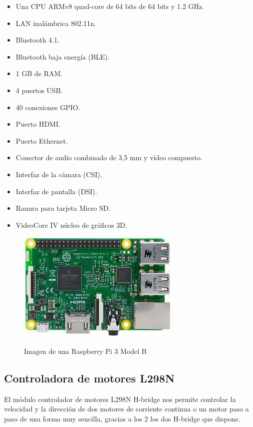\begin{itemize}
 \item Una CPU ARMv8 quad-core de 64 bits de 64 bits y 1.2 GHz.
 \item LAN inalámbrica 802.11n.
 \item Bluetooth 4.1.
 \item Bluetooth baja energía (BLE).
 \item 1 GB de RAM.
 \item 4 puertos USB.
 \item 40 conexiones GPIO.
 \item Puerto HDMI.
 \item Puerto Ethernet.
 \item Conector de audio combinado de 3,5 mm y vídeo compuesto.
 \item Interfaz de la cámara (CSI).
 \item Interfaz de pantalla (DSI).
 \item Ranura para tarjeta Micro SD.
 \item VideoCore IV núcleo de gráficos 3D. 
\end{itemize}


\begin{figure}[H]
  \begin{center}
    \includegraphics[scale=0.5]{imagenes/raspberry-pi.jpg}\\
    \caption{Imagen de una Raspberry Pi 3 Model B}
  \end{center}
\end{figure}


\subsection{Controladora de motores L298N}


El módulo controlador de motores L298N H-bridge nos permite controlar la velocidad y la dirección de dos motores de corriente continua o un motor paso a paso de una forma muy sencilla,
gracias a los 2 los dos H-bridge que dispone.\\

